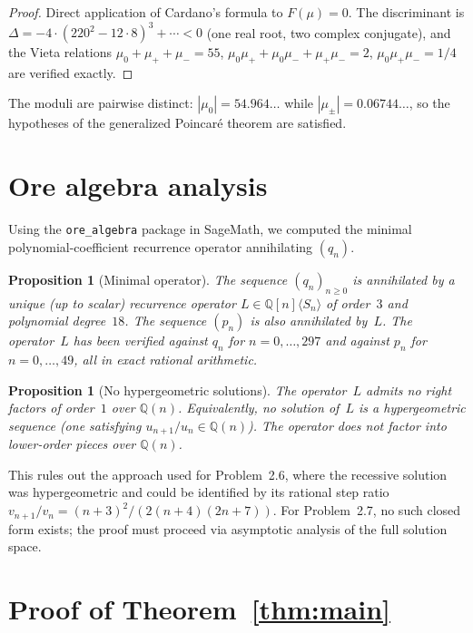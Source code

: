 \documentclass[11pt]{article}
\newtheorem{proposition}[theorem]{Proposition}
\theoremstyle{remark}
\begin{document}
\begin{proof}
Direct application of Cardano's formula to $F(\mu) = 0$. The
discriminant is $\Delta = -4\cdot(220^2 - 12\cdot 8)^3
+ \cdots < 0$ (one real root, two complex conjugate), and the
Vieta relations $\mu_0 + \mu_+ + \mu_- = 55$,
$\mu_0\mu_+ + \mu_0\mu_- + \mu_+\mu_- = 2$,
$\mu_0\mu_+\mu_- = 1/4$ are verified exactly.
\end{proof}

The moduli are pairwise distinct: $|\mu_0| = 54.964\ldots$
while $|\mu_\pm| = 0.06744\ldots$, so the hypotheses of the
generalized Poincar\'e theorem are satisfied.

\section{Ore algebra analysis}\label{sec:ore}

Using the \texttt{ore\_algebra} package in SageMath, we
computed the minimal polynomial-coefficient recurrence operator
annihilating $(q_n)$.

\begin{proposition}[Minimal operator]\label{prop:ore}
The sequence $(q_n)_{n \ge 0}$ is annihilated by a unique
(up to scalar) recurrence operator
$L \in \mathbb{Q}[n]\langle S_n \rangle$ of order~$3$ and
polynomial degree~$18$. The sequence $(p_n)$ is also
annihilated by~$L$. The operator~$L$ has been verified
against $q_n$ for $n = 0, \ldots, 297$ and against $p_n$
for $n = 0, \ldots, 49$, all in exact rational arithmetic.
\end{proposition}

\begin{proposition}[No hypergeometric solutions]\label{prop:nohyp}
The operator~$L$ admits no right factors of order~$1$ over
$\mathbb{Q}(n)$. Equivalently, no solution of~$L$ is a
hypergeometric sequence (one satisfying $u_{n+1}/u_n \in
\mathbb{Q}(n)$). The operator does not factor into
lower-order pieces over $\mathbb{Q}(n)$.
\end{proposition}

This rules out the approach used for Problem~2.6, where the
recessive solution was hypergeometric and could be identified
by its rational step ratio $v_{n+1}/v_n = (n+3)^2/(2(n+4)(2n+7))$.
For Problem~2.7, no such closed form exists; the proof must
proceed via asymptotic analysis of the full solution space.

\section{Proof of Theorem~\ref{thm:main}}\label{sec:proof}
\end{document}

